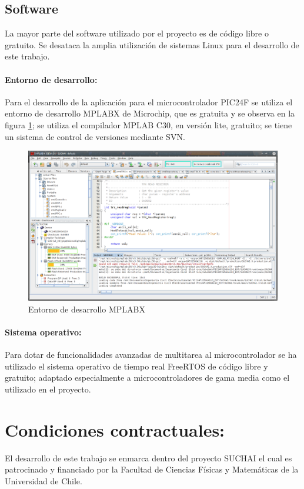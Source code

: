 \documentclass[11pt,letterpaper]{article}
\begin{document}
\subsection{Software}
La mayor parte del software utilizado por el proyecto es de código libre o gratuito. Se desataca la amplia utilización de sistemas Linux para el desarrollo de este trabajo.

\paragraph{Entorno de desarrollo:}
Para el desarrollo de la aplicación para el microcontrolador PIC24F se utiliza el entorno de desarrollo MPLABX de Microchip, que es gratuita y se observa en la figura \ref{mplabx}; se utiliza el compilador MPLAB C30, en versión lite, gratuito; se tiene un sistema de control de versiones mediante SVN.

\begin{figure}[!h] 
\centering \includegraphics[scale=0.4]{img/mplabx.png}
\caption{Entorno de desarrollo MPLABX} \label{mplabx}
\end{figure}

\paragraph{Sistema operativo:}
Para dotar de funcionalidades avanzadas de multitarea al microcontrolador se ha utilizado el sistema operativo de tiempo real FreeRTOS de código libre y gratuito; adaptado especialmente a microcontroladores de gama media como el utilizado en el proyecto.

\section{Condiciones contractuales:}
El desarrollo de este trabajo se enmarca dentro del proyecto SUCHAI el cual es patrocinado y financiado por la Facultad de Ciencias Físicas y Matemáticas de la Universidad de Chile.
\end{document}
